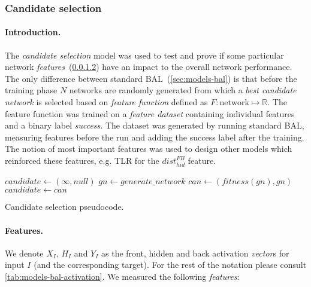 \subsubsection{Candidate selection} 
\label{sec:sim-exp-candidates}

\paragraph{Introduction.} 
The \emph{candidate selection} model was used to test and prove if some particular network \emph{features}~(\ref{sec:our-candidates-features}) have an impact to the overall network performance. The only difference between standard BAL~(\ref{sec:models-bal}) is that before the training phase $N$ networks are randomly generated from which a \emph{best candidate network} is selected based on \emph{feature function} defined as $F: \mbox{network} \mapsto \mathbb{R}$. The feature function was trained on a \emph{feature dataset} containing individual features and a binary label \emph{success}. The dataset was generated by running standard BAL, measuring features before the run and adding the success label after the training. The notion of most important features was used to design other models which reinforced these features, e.g. TLR for the $dist_{hid}^{FB}$ feature. 

\begin{algorithm}[H]
  \begin{algorithmic}
    \State $candidate \gets (\infty, null)$
      \State $gn \gets generate\_network$
      \State $can \gets (fitness(gn), gn)$
        \State $candidate \gets can$
      \EndIf
    \EndFor
  \caption{Candidate selection pseudocode.}
  \label{alg:our-candidates-pseudocode} 
  \end{algorithmic}
\end{algorithm} 

\paragraph{Features.}
\label{sec:our-candidates-features}

We denote $X_I$, $H_I$ and $Y_I$ as the front, hidden and back activation \emph{vector}s for input $I$ (and the corresponding target). For the rest of the notation please consult \ref{tab:models-bal-activation}. We measured the following \emph{features}: 


